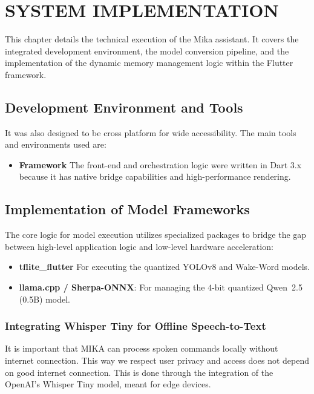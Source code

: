 \documentclass[12pt,a4paper]{report}
\begin{document}
\chapter{SYSTEM IMPLEMENTATION}
This chapter details the technical execution of the Mika assistant. It covers the integrated development environment, the model conversion pipeline, and the implementation of the dynamic memory management logic within the Flutter framework.

\section{Development Environment and Tools}
It was also designed to be cross platform for wide accessibility. The main tools and environments used are:

\begin{itemize}
     \item[1.] \textbf{Framework} The front-end and orchestration logic were written in Dart 3.x because it has native bridge capabilities and high-performance rendering.
\end{itemize}
 
\section{Implementation of Model Frameworks}
The core logic for model execution utilizes specialized packages to bridge the gap between high-level application logic and low-level hardware acceleration:
 
\begin{itemize}
    \item[1.] \textbf{tflite\_flutter} For executing the quantized YOLOv8 and Wake-Word models.
    \item[2.] \textbf{llama.cpp / Sherpa-ONNX}: For managing the $4\text{-bit}$ quantized Qwen~2.5 (0.5B) model.
\end{itemize}
 
\subsection{Integrating Whisper Tiny for Offline Speech-to-Text}
It is important that MIKA can process spoken commands locally without internet connection. This way we respect user privacy and access does not depend on good internet connection. This is done through the integration of the OpenAI’s Whisper Tiny model, meant for edge devices. 
\end{document}
